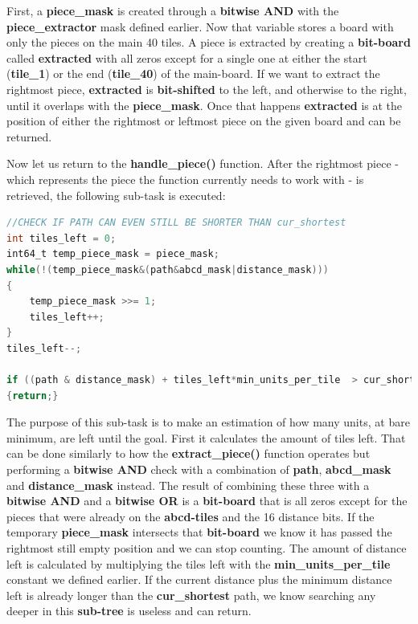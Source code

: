 \documentclass[12pt]{article}
\begin{document}
First, a \textbf{piece\_mask} is created through a \textbf{bitwise AND} with the \textbf{piece\_extractor} mask defined earlier. Now that variable stores a board with only the pieces on the main 40 tiles. A piece is extracted by creating a \textbf{bit-board} called \textbf{extracted} with all zeros except for a single one at either the start (\textbf{tile\_1}) or the end (\textbf{tile\_40}) of the main-board. If we want to extract the rightmost piece, \textbf{extracted} is \textbf{bit-shifted} to the left, and otherwise to the right, until it overlaps with the \textbf{piece\_mask}. Once that happens \textbf{extracted} is at the position of either the rightmost or leftmost piece on the given board and can be returned.

\newpage

Now let us return to the \textbf{handle\_piece()} function. After the rightmost piece - which represents the piece the function currently needs to work with - is retrieved, the following sub-task is executed:


\begin{lstlisting}[language=C, caption={Return condition}, label={lst:return-condition}]
//CHECK IF PATH CAN EVEN STILL BE SHORTER THAN cur_shortest
int tiles_left = 0;
int64_t temp_piece_mask = piece_mask;
while(!(temp_piece_mask&(path&abcd_mask|distance_mask)))
{
    temp_piece_mask >>= 1;
    tiles_left++;
}
tiles_left--;

if ((path & distance_mask) + tiles_left*min_units_per_tile  > cur_shortest)
{return;}

\end{lstlisting}

The purpose of this sub-task is to make an estimation of how many units, at bare minimum, are left until the goal. First it calculates the amount of tiles left. That can be done similarly to how the \textbf{extract\_piece()} function operates but performing a \textbf{bitwise AND} check with a combination of \textbf{path}, \textbf{abcd\_mask} and \textbf{distance\_mask} instead. The result of combining these three with a \textbf{bitwise AND} and a \textbf{bitwise OR} is a \textbf{bit-board} that is all zeros except for the pieces that were already on the \textbf{abcd-tiles} and the 16 distance bits. If the temporary \textbf{piece\_mask} intersects that \textbf{bit-board} we know it has passed the rightmost still empty position and we can stop counting.
The amount of distance left is calculated by multiplying the tiles left with the \textbf{min\_units\_per\_tile} constant we defined earlier. If the current distance plus the minimum distance left is already longer than the \textbf{cur\_shortest} path, we know searching any deeper in this \textbf{sub-tree} is useless and can return.
\linebreak
\end{document}
